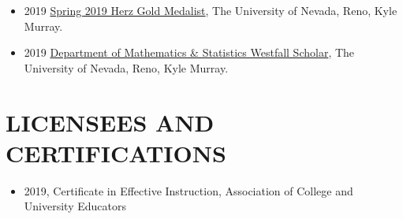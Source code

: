 \documentclass[paper=a4,fontsize=11pt]{scrartcl} %
\newcommand{\NewPart}[2]{\section*{\uppercase{#1} #2 }}
\begin{document}
\begin{itemize}[noitemsep]
\item 2019 \href{https://www.unr.edu/nevada-today/news/2019/spring-2019-herz-gold-medalist?utm_source=newsletter051619&utm_medium=email&utm_content=kylemurray&utm_campaign=NevadaWeekly}{Spring 2019 Herz Gold Medalist}, The University of Nevada, Reno, Kyle Murray.
  \item 2019 \href{https://www.unr.edu/science/student-resources/student-competitions-awards}{Department of Mathematics \& Statistics Westfall Scholar}, The University of Nevada, Reno, Kyle Murray.

\vspace{-7pt}
\end{itemize}  



\NewPart{Licensees and Certifications}{}
\vspace{-7pt}

\begin{itemize}[noitemsep]
    \item 2019, Certificate in Effective Instruction, Association of College and University Educators
\end{itemize}
\end{document}
